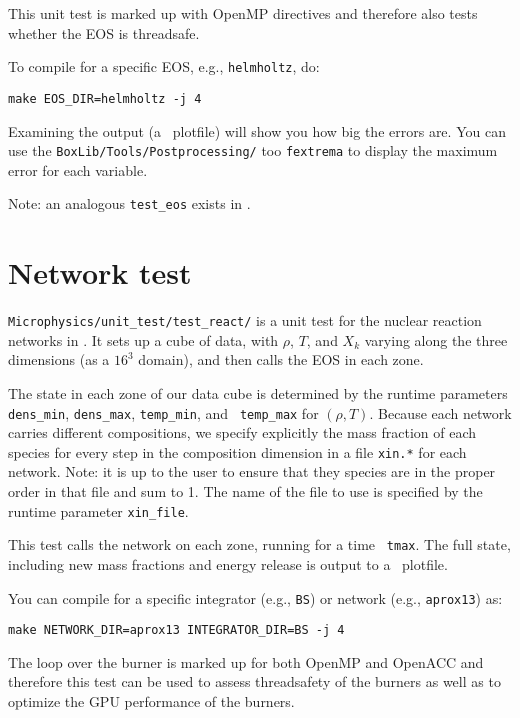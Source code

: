 This unit test is marked up with OpenMP directives and therefore also
tests whether the EOS is threadsafe.

To compile for a specific EOS, e.g., {\tt helmholtz}, do:
\begin{verbatim}
make EOS_DIR=helmholtz -j 4
\end{verbatim}

Examining the output (a \boxlib\ plotfile) will show you how big the
errors are.  You can use the {\tt BoxLib/Tools/Postprocessing/} too
{\tt fextrema} to display the maximum error for each variable.

Note: an analogous {\tt test\_eos} exists in \maestro.

\section{Network test}

{\tt Microphysics/unit\_test/test\_react/} is a unit test for the
nuclear reaction networks in \microphysics.  It sets up a cube of
data, with $\rho$, $T$, and $X_k$ varying along the three dimensions
(as a $16^3$ domain), and then calls the EOS in each zone.  

The state in each zone of our data cube is determined by the runtime
parameters {\tt dens\_min}, {\tt dens\_max}, {\tt temp\_min}, and {\tt
  temp\_max} for $(\rho, T)$.  Because each network carries different
compositions, we specify explicitly the mass fraction of each species
for every step in the composition dimension in a file {\tt xin.*} for
each network.  Note: it is up to the user to ensure that they species
are in the proper order in that file and sum to 1.  The name of the
file to use is specified by the runtime parameter {\tt xin\_file}.

This test calls the network on each zone, running for a time {\tt
  tmax}.  The full state, including new mass fractions and energy
release is output to a \boxlib\ plotfile.

You can compile for a specific integrator (e.g., {\tt BS}) or 
network (e.g., {\tt aprox13}) as:
\begin{verbatim}
make NETWORK_DIR=aprox13 INTEGRATOR_DIR=BS -j 4
\end{verbatim}

The loop over the burner is marked up for both OpenMP and OpenACC and
therefore this test can be used to assess threadsafety of the burners
as well as to optimize the GPU performance of the burners.



